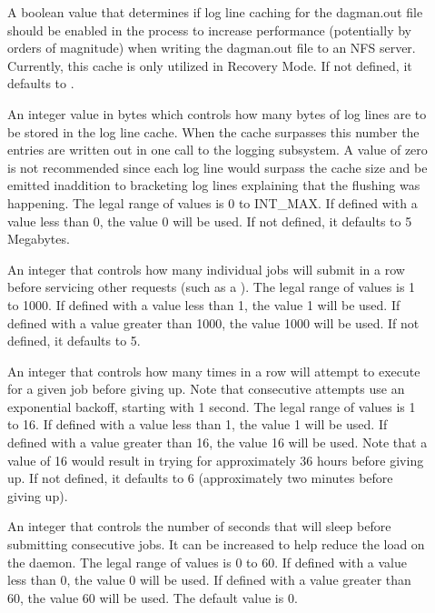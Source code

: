 \begin{description}
\item[]
\label{param:DAGManDebugCacheEnable}
A boolean value that determines if log line caching for the dagman.out
file should be enabled in the  process to increase
performance (potentially by orders of magnitude) when writing the
dagman.out file to an NFS server. Currently, this cache is only utilized
in Recovery Mode.  
If not defined, it defaults to .

\item[]
\label{param:DAGManDebugCacheSize}
An integer value in bytes which controls how many bytes of log lines are to
be stored in the log line cache. When the cache surpasses this number the
entries are written out in one call to the logging subsystem. A value of
zero is not recommended since each log line would surpass the cache size 
and be emitted inaddition to bracketing log lines explaining that the 
flushing was happening.
The legal range of values is 0 to INT\_MAX.
If defined with a value less than 0, the  value 0 will be used.
If not defined, it defaults to 5 Megabytes.

\item[]
\label{param:DAGManMaxSubmitsPerInterval}
An integer that controls how many individual jobs
 will submit in a row
before servicing other requests (such as a ).
The legal range of values is 1 to 1000.
If defined with a value less than 1, the  value 1 will be used.
If defined with a value greater than 1000, the value 1000 will be used.
If not defined, it defaults to 5.

\item[]
\label{param:DAGManMaxSubmitAttempts}
An integer that controls how
many times in a row  will attempt to execute
 for a given job before giving up.
Note that consecutive attempts use an exponential backoff,
starting with 1 second.
The legal range of values is 1 to 16.
If defined with a value less than 1, the  value 1 will be used.
If defined with a value greater than 16, the value 16 will be used.
Note that a value of 16 would result in  trying for
approximately 36 hours before giving up.
If not defined,
it defaults to 6 (approximately two minutes before giving up).

\item[]
\label{param:DAGManSubmitDelay}
An integer that controls the number of seconds
that  will sleep before submitting consecutive jobs.
It can be increased to help reduce the load on the  daemon.
The legal range of values is 0 to 60.
If defined with a value less than 0, the  value 0 will be used.
If defined with a value greater than 60, the value 60 will be used.
The default value is 0.


\end{description}
